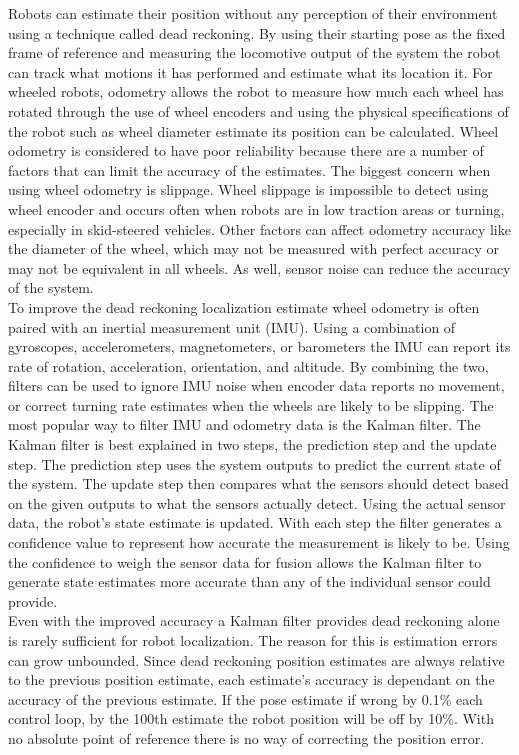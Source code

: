 Robots can estimate their position without any perception of their environment using a technique called dead reckoning. By using their starting pose as the fixed frame of reference and measuring the locomotive output of the system the robot can track what motions it has performed and estimate what its location it. For wheeled robots, odometry allows the robot to measure how much each wheel has rotated through the use of wheel encoders and using the physical specifications of the robot such as wheel diameter estimate its position can be calculated. Wheel odometry is considered to have poor reliability because there are a number of factors that can limit the accuracy of the estimates. The biggest concern when using wheel odometry is slippage. Wheel slippage is impossible to detect using wheel encoder and occurs often when robots are in low traction areas or turning, especially in skid-steered vehicles. Other factors can affect odometry accuracy like the diameter of the wheel, which may not be measured with perfect accuracy or may not be equivalent in all wheels. As well, sensor noise can reduce the accuracy of the system.\\

To improve the dead reckoning localization estimate wheel odometry is often paired with an inertial measurement unit (IMU). Using a combination of gyroscopes, accelerometers, magnetometers, or barometers the IMU can report its rate of rotation, acceleration, orientation, and altitude. By combining the two, filters can be used to ignore IMU noise when encoder data reports no movement, or correct turning rate estimates when the wheels are likely to be slipping. The most popular way to filter IMU and odometry data is the Kalman filter. The Kalman filter is best explained in two steps, the prediction step and the update step. The prediction step uses the system outputs to predict the current state of the system. The update step then compares what the sensors should detect based on the given outputs to what the sensors actually detect. Using the actual sensor data, the robot's state estimate is updated. With each step the filter generates a confidence value to represent how accurate the measurement is likely to be. Using the confidence to weigh the sensor data for fusion allows the Kalman filter to generate state estimates more accurate than any of the individual sensor could provide.\\

Even with the improved accuracy a Kalman filter provides dead reckoning alone is rarely sufficient for robot localization. The reason for this is estimation errors can grow unbounded. Since dead reckoning position estimates are always relative to the previous position estimate, each estimate's accuracy is dependant on the accuracy of the previous estimate. If the pose estimate if wrong by 0.1\% each control loop, by the 100th estimate the robot position will be off by 10\%. With no absolute point of reference there is no way of correcting the position error.\\

